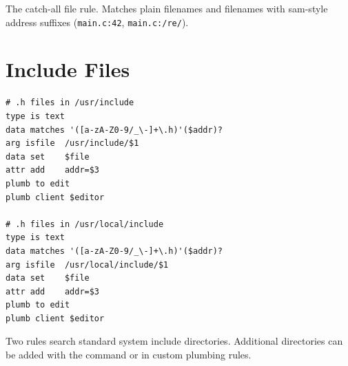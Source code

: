 The catch-all file rule.  Matches plain filenames and filenames with
sam-style address suffixes (\texttt{main.c:42}, \texttt{main.c:/re/}).

\section{Include Files}

\begin{lstlisting}[frame=none,basicstyle=\small\ttfamily]
# .h files in /usr/include
type is text
data matches '([a-zA-Z0-9/_\-]+\.h)'($addr)?
arg isfile  /usr/include/$1
data set    $file
attr add    addr=$3
plumb to edit
plumb client $editor

# .h files in /usr/local/include
type is text
data matches '([a-zA-Z0-9/_\-]+\.h)'($addr)?
arg isfile  /usr/local/include/$1
data set    $file
attr add    addr=$3
plumb to edit
plumb client $editor
\end{lstlisting}

Two rules search standard system include directories.  Additional
directories can be added with the  command or in custom
plumbing rules.
